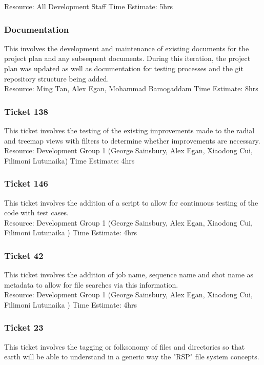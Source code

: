 \documentclass{article}
\begin{document}
	Resource: All Development Staff
	Time Estimate: 5hrs

\subsubsection{Documentation}
	This involves the development and maintenance of existing documents for the project plan and any subsequent documents. During this iteration, the project plan was updated as well as documentation for testing processes and the git repository structure being added.\\
	
	Resource: Ming Tan, Alex Egan, Mohammad Bamogaddam
	Time Estimate: 8hrs

\subsubsection{Ticket 138}
	This ticket involves the testing of the existing improvements made to the radial and treemap views with filters to determine whether improvements are necessary.\\
	
	Resource: Development Group 1 (George Sainsbury, Alex Egan, Xiaodong Cui, Filimoni Lutunaika)
	Time Estimate: 4hrs

\subsubsection{Ticket 146}
	This ticket involves the addition of a script to allow for continuous testing of the code with test cases.\\
	
	Resource: Development Group 1 (George Sainsbury, Alex Egan, Xiaodong Cui, Filimoni Lutunaika )
	Time Estimate: 4hrs

\subsubsection{Ticket 42}
	This ticket involves the addition of job name, sequence name and shot name as metadata to allow for file searches via this information.\\
	
	Resource: Development Group 1 (George Sainsbury, Alex Egan, Xiaodong Cui, Filimoni Lutunaika )
	Time Estimate: 4hrs

\subsubsection{Ticket 23}
	This ticket involves the tagging or folksonomy of files and directories so that earth will be able to understand in a generic way the "RSP" file system concepts.\\
\end{document}
